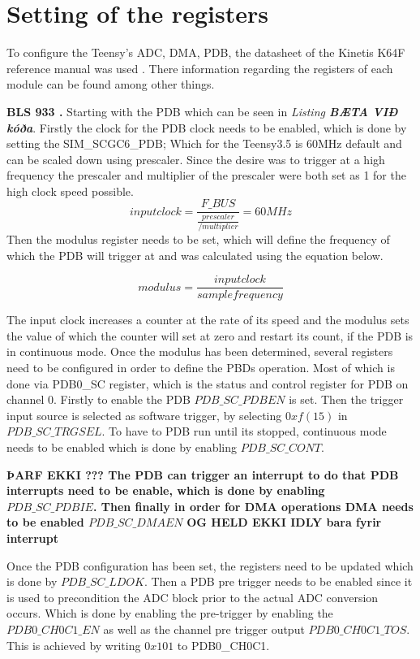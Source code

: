 \chapter{Setting of the registers}
To configure the Teensy's ADC, DMA, PDB, the datasheet of the Kinetis K64F reference manual was used \cite{freescale_semiconductor_kinetis_2021}.
There information regarding the registers of each module can be found among other things.

\textbf{BLS 933 \cite{freescale_semiconductor_kinetis_2021}.}
Starting with the PDB  which can be seen in \textit{Listing \textbf{BÆTA VIÐ kóða}}.
Firstly the clock for the PDB clock needs to be enabled, which is done by setting the SIM\_SCGC6\_PDB;
Which for the Teensy3.5 is 60MHz default and can be scaled down using prescaler.
Since the desire was to trigger at a high frequency the prescaler and multiplier of the prescaler were both set as 1 for the high clock speed possible.
\textbf{$$input clock = \frac{F\_BUS}{\frac{prescaler}{/multiplier}} = 60MHz$$}
Then the modulus register needs to be set, which will define the frequency of which the PDB will trigger at and was calculated using the equation below.

$$modulus = \frac{input clock}{sample frequency}$$

The input clock increases a counter at the rate of its speed and the modulus sets the value of which the counter will set at zero and restart its count, if the PDB is in continuous mode.
Once the modulus has been determined, several registers need to be configured in order to define the PBDs operation.
Most of which is done via PDB0\_SC register, which is the status and control register for PDB on channel 0.
Firstly to enable the PDB $ PDB\_SC\_PDBEN $ is set.
Then the trigger input source is selected as software trigger, by selecting $0xf (15)$ in $ PDB\_SC\_TRGSEL $.
To have to PDB run until its stopped, continuous mode needs to be enabled which is done by enabling $ PDB\_SC\_CONT $.

\textbf{ÞARF EKKI ???
The PDB can trigger an interrupt to do that PDB interrupts need to be enable, which is done by enabling
$ PDB\_SC\_PDBIE $.
Then finally in order for DMA operations DMA needs to be enabled
$ PDB\_SC\_DMAEN$} 
\textbf{OG HELD EKKI IDLY bara fyrir interrupt}

Once the PDB configuration has been set, the registers need to be updated which is done by $ PDB\_SC\_LDOK$.
Then a PDB pre trigger needs to be enabled since it is used to precondition the ADC block prior to the actual ADC conversion occurs.
Which is done by enabling the pre-trigger by enabling the $PDB0\_CH0C1\_EN$ as well as the channel pre trigger output $PDB0\_CH0C1\_TOS$.
This is achieved by writing $0x101$ to PDB0\_CH0C1.

